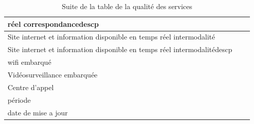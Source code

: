 \documentclass[a4paper]{report}
\begin{document}
\begin{doublespace}
\begin{table}[H]
\begin{center}
\begin{tabularx}{17.5cm}{|X|p{3cm}|p{1.5cm}|}
				réel correspondancedescp                                             &                        &                  \\
				\hline
				Site internet et information disponible en temps réel intermodalité  &                        &                  \\
				\hline
				Site internet et information disponible en temps
				réel intermodalitédescp                                              &                        &                  \\
				\hline
				wifi embarqué                                                        &                        &                  \\
				\hline
				Vidéosurveillance embarquée                                          &                        &                  \\
				\hline
				Centre d'appel                                                       &                        &                  \\
				\hline
				période                                                              &                        &                  \\
				\hline
				date de mise a jour                                                  &                        &                  \\
				\hline
			\end{tabularx}
			\caption{Suite de la table de la qualité des services}
		\end{center}
	\end{table}


\end{doublespace}
\end{document}

